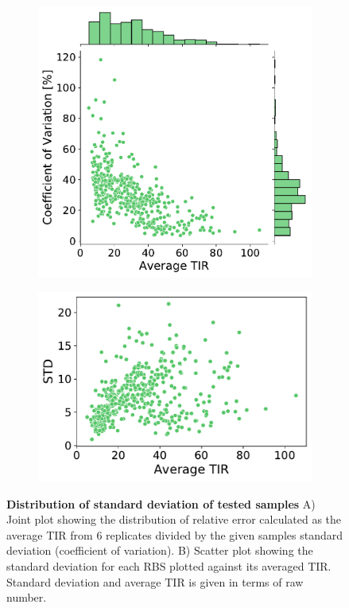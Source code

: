 \documentclass{scrartcl}[2013/05/29]%
\begin{document}
\begin{figure}[!ht]
    \centering
    \begin{subfigure}[b]{0.49\textwidth}
        \centering
        \caption{}
        \includegraphics[scale=0.4]{plots/Supplementary/SD.pdf}
    \end{subfigure}
    \hfill
    \begin{subfigure}[b]{0.49\textwidth}
        \centering
        \caption{}
        \includegraphics[scale=0.6]{plots/Supplementary/SDvsTIR.pdf}
    \end{subfigure}
    \caption{\textbf{Distribution of standard deviation of tested samples} A) Joint plot showing the distribution of relative error calculated as the average TIR from 6 replicates divided by the given samples standard deviation (coefficient of variation). B) Scatter plot showing the standard deviation for each RBS plotted against its averaged TIR. Standard deviation and average TIR is given in terms of raw number.}
    \label{fig:variation of biological replicates}
\end{figure}
\end{document}
